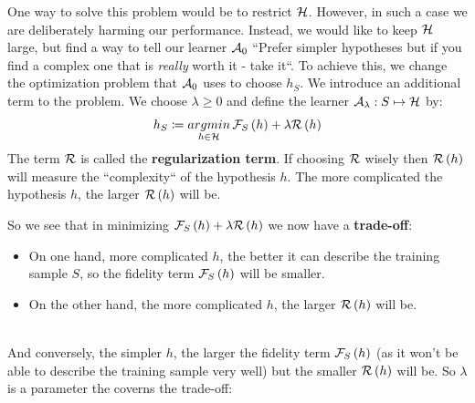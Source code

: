 One way to solve this problem would be to restrict $\mathcal{H}$. However, in such a case we are deliberately harming our performance. Instead, we would like to keep $\mathcal{H}$ large, but find a way to tell our learner $\mathcal{A}_0$ ``Prefer simpler hypotheses but if you find a complex one that is \textit{really} worth it - take it``. To achieve this, we change the optimization problem that $\mathcal{A}_0$ uses to choose $h_S$. We introduce an additional term to the problem. We choose $\lambda\geq 0$ and define the learner $\mathcal{A}_\lambda:S\mapsto\mathcal{H}$ by: $$ h_S\coloneqq \underset{h\in\mathcal{H}}{argmin}\, \mathcal{F}_S\left(h\right)+\lambda\mathcal{R}\left(h\right) $$
The term $\mathcal{R}$ is called the \textbf{regularization term}. If choosing $\mathcal{R}$ wisely then $\mathcal{R}\left(h\right)$ will measure the ``complexity`` of the hypothesis $h$. The more complicated the hypothesis $h$, the larger $\mathcal{R}\left(h\right)$ will be.


So we see that in minimizing $ \mathcal{F}_S\left(h\right)+ \lambda \mathcal{R}\left(h\right)$ we now have a \textbf{trade-off}:
\begin{itemize}
	\item On one hand, more complicated $h$, the better it can describe the training sample $S$, so the fidelity term $\mathcal{F}_S\left(h\right)$ will be smaller.
	\item On the other hand, the more complicated $h$, the larger $\mathcal{R}\left(h\right)$ will	be. 
\end{itemize}
~\\
And conversely, the simpler $h$, the larger the fidelity term $\mathcal{F}_S\left(h\right)$ (as it won't be able to describe the training sample very well) but the smaller
$\mathcal{R}\left(h\right)$ will be. So $\lambda$ is a parameter the coverns the trade-off:

